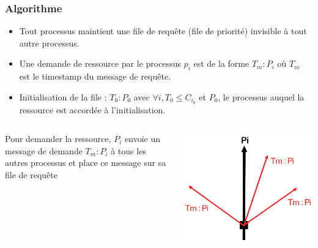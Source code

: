 \documentclass[compress]{beamer}
\begin{document}
\begin{frame}
\frametitle{Algorithme}
\begin{itemize}
\item Tout processus maintient une file de requête (file de priorité) invisible à tout autre processus.
\item Une demande de ressource par le processus $p_i$ est de la forme $T_m:P_i$ où $T_m$ est le timestamp du message de requête.
\item Initialisation de la file : {$T_0:P_0$} avec $\forall i,  T_0 \leq C_{i_0}$ et $P_0$, le processus auquel la ressource est accordée à l'initialisation.
\end{itemize}
	\begin{columns}
    	\begin{column}{.5\textwidth}
			Pour demander la ressource, $P_i$ envoie un message de demande $T_m : P_i$ à tous les autres processus et place ce message sur sa file de requête
		\end{column}
		\begin{column}{.5\textwidth}
		\begin{center}
		\includegraphics[scale=0.6]{process8.png}
		\end{center}
		
		\end{column}
	\end{columns}
\end{frame}
\end{document}
